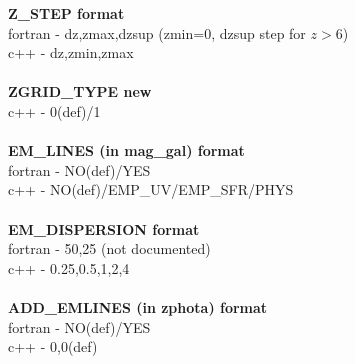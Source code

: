 \documentclass[12pt]{article}
\begin{document}
{\bf Z\_STEP format}\\
fortran - dz,zmax,dzsup (zmin=0, dzsup step for $z>6$)\\
c++     - dz,zmin,zmax\\
\\
{\bf ZGRID\_TYPE new}\\
c++     - 0(def)/1\\
\\
{\bf EM\_LINES (in mag\_gal) format}\\
fortran - NO(def)/YES\\
c++     - NO(def)/EMP\_UV/EMP\_SFR/PHYS\\
\\
{\bf EM\_DISPERSION format}\\
fortran - 50,25 (not documented)\\
c++     - 0.25,0.5,1,2,4\\
\\
{\bf ADD\_EMLINES (in zphota) format}\\
fortran - NO(def)/YES\\
c++     - 0,0(def)\\
\\



%

% 
\end{document}
